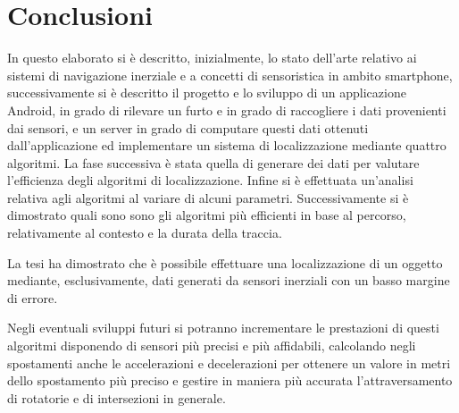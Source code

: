 \documentclass[12pt,a4paper,openright,twoside]{report}
\renewcommand{\chaptermark}[1]{\markboth{\thechapter.\ #1}{}}
\begin{document}
\clearpage{\pagestyle{empty}\cleardoublepage}
\chapter*{Conclusioni}

In questo elaborato si è descritto, inizialmente, lo stato dell'arte relativo ai sistemi di navigazione inerziale e a concetti di sensoristica in ambito smartphone, successivamente si è descritto il progetto e lo sviluppo di un applicazione Android, in grado di rilevare un furto e in grado di raccogliere i dati provenienti dai sensori, e un server in grado di computare questi dati ottenuti dall'applicazione ed implementare un sistema di localizzazione mediante quattro algoritmi. La fase successiva è stata quella di generare dei dati per valutare l'efficienza degli algoritmi di localizzazione. Infine si è effettuata un'analisi relativa agli algoritmi al variare di alcuni parametri. Successivamente si è dimostrato quali sono sono gli algoritmi più efficienti in base al percorso, relativamente al contesto e la durata della traccia.

La tesi ha dimostrato che è possibile effettuare una localizzazione di un oggetto mediante, esclusivamente, dati generati da sensori inerziali con un basso margine di errore. 

Negli eventuali sviluppi futuri si potranno incrementare le prestazioni di questi algoritmi disponendo di sensori più precisi e più affidabili, calcolando negli spostamenti anche le accelerazioni e decelerazioni per ottenere un valore in metri dello spostamento più preciso e gestire in maniera più accurata l'attraversamento di rotatorie e di intersezioni in generale.

\renewcommand{\chaptermark}[1]{\markright{\thechapter \ #1}{}}
\lhead[\fancyplain{}{\bfseries\thepage}]{\fancyplain{}{\bfseries\rightmark}}
\end{document}
